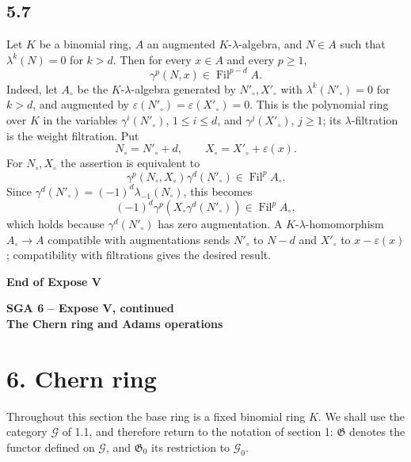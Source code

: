 \documentclass[13pt]{extarticle}
\newcommand{\Go}{\mathfrak G}
\newcommand{\Goi}{\mathfrak G_0}
\newcommand{\Fil}{\operatorname{Fil}}
\begin{document}
\subsection*{5.7}
Let $K$ be a binomial ring, $A$ an augmented $K$-$\lambda$-algebra, and $N\in A$ such that $\lambda^k(N)=0$ for $k>d$. Then for every $x\in A$ and every $p\geq 1$,
\begin{equation}\label{eq:5.7.1}
\gamma^p(N,x)\in\Fil^{p-d}A.
\end{equation}
Indeed, let $A_\circ$ be the $K$-$\lambda$-algebra generated by $N'_\circ,X'_\circ$ with $\lambda^k(N'_\circ)=0$ for $k>d$, and augmented by $\varepsilon(N'_\circ)=\varepsilon(X'_\circ)=0$. This is the polynomial ring over $K$ in the variables $\gamma^i(N'_\circ)$, $1\leq i\leq d$, and $\gamma^j(X'_\circ)$, $j\geq 1$; its $\lambda$-filtration is the weight filtration. Put
\[
N_\circ=N'_\circ+d,
\qquad
X_\circ=X'_\circ+\varepsilon(x).
\]
For $N_\circ,X_\circ$ the assertion is equivalent to
\[
\gamma^p(N_\circ,X_\circ)\gamma^d(N'_\circ)\in\Fil^pA_\circ.
\]
Since $\gamma^d(N'_\circ)=(-1)^d\lambda_{-1}(N_\circ)$, this becomes
\[
(-1)^d\gamma^p(X_\circ\gamma^d(N'_\circ))\in\Fil^pA_\circ,
\]
which holds because $\gamma^d(N'_\circ)$ has zero augmentation. A $K$-$\lambda$-homomorphism $A_\circ\to A$ compatible with augmentations sends $N'_\circ$ to $N-d$ and $X'_\circ$ to $x-\varepsilon(x)$; compatibility with filtrations gives the desired result.

\begin{center}
\textbf{End of Expose V}
\end{center}

\clearpage

\begin{center}
{\Large\textbf{SGA 6 -- Expose V, continued}}\\[0.35em]
{\large\textbf{The Chern ring and Adams operations}}
\end{center}

\section*{6. Chern ring}

Throughout this section the base ring is a fixed binomial ring $K$. We shall use the category $\mathcal G$ of 1.1, and therefore return to the notation of section 1: $\Go$ denotes the functor defined on $\mathcal G$, and $\Goi$ its restriction to $\mathcal G_0$.
\end{document}
